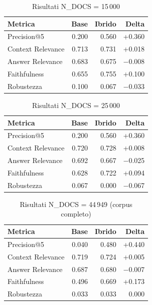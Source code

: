 \documentclass[12pt,a4paper]{article}
\begin{document}
\begin{table}[H]
  \centering
  \caption{Risultati N\_DOCS = 15\,000}
  \begin{tabular}{lrrr}
    \toprule
    \textbf{Metrica} & \textbf{Base} & \textbf{Ibrido} & \textbf{Delta} \\
    \midrule
    Precision@5        & 0.200 & 0.560 & +0.360 \\
    Context Relevance  & 0.713 & 0.731 & +0.018 \\
    Answer Relevance   & 0.683 & 0.675 & $-$0.008 \\
    Faithfulness       & 0.655 & 0.755 & +0.100 \\
    Robustezza         & 0.100 & 0.067 & $-$0.033 \\
    \bottomrule
  \end{tabular}
\end{table}

\begin{table}[H]
  \centering
  \caption{Risultati N\_DOCS = 25\,000}
  \begin{tabular}{lrrr}
    \toprule
    \textbf{Metrica} & \textbf{Base} & \textbf{Ibrido} & \textbf{Delta} \\
    \midrule
    Precision@5        & 0.200 & 0.560 & +0.360 \\
    Context Relevance  & 0.720 & 0.728 & +0.008 \\
    Answer Relevance   & 0.692 & 0.667 & $-$0.025 \\
    Faithfulness       & 0.628 & 0.722 & +0.094 \\
    Robustezza         & 0.067 & 0.000 & $-$0.067 \\
    \bottomrule
  \end{tabular}
\end{table}

\begin{table}[H]
  \centering
  \caption{Risultati N\_DOCS = 44\,949 (corpus completo)}
  \begin{tabular}{lrrr}
    \toprule
    \textbf{Metrica} & \textbf{Base} & \textbf{Ibrido} & \textbf{Delta} \\
    \midrule
    Precision@5        & 0.040 & 0.480 & +0.440 \\
    Context Relevance  & 0.719 & 0.724 & +0.005 \\
    Answer Relevance   & 0.687 & 0.680 & $-$0.007 \\
    Faithfulness       & 0.496 & 0.669 & +0.173 \\
    Robustezza         & 0.033 & 0.033 & 0.000 \\
    \bottomrule
  \end{tabular}
\end{table}
\end{document}
